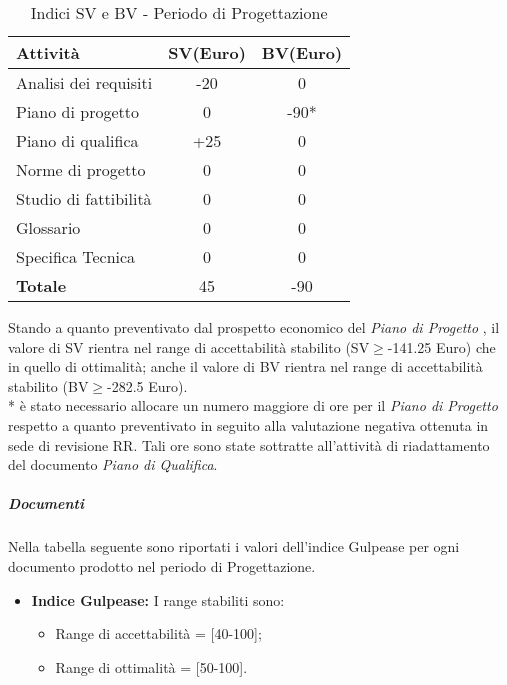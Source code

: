        
      \begin{table}[H]
        \centering
        \begin{tabular}{|l|c|c|}
          \hline
          \textbf{Attività} &\textbf{SV}(Euro)  &\textbf{BV}(Euro) \\
          \hline
          Analisi dei requisiti  &-20 &0  \\
          Piano di progetto &0  &-90*\\
          Piano di qualifica  &+25  &0\\
          Norme di progetto &0  &0 \\
          Studio di fattibilità &0  &0  \\
          Glossario &0  &0  \\
          Specifica Tecnica & 0 & 0\\
          \hline
          \textbf{Totale} &45  &-90  \\
          \hline
        \end{tabular}
        \caption{Indici SV e BV - Periodo di Progettazione}
      \end{table}
      Stando a quanto preventivato dal prospetto economico del \emph{Piano di Progetto \VersionePP{}}, il valore di SV rientra nel range di accettabilità stabilito (SV\(\geq\)-141.25 Euro) che in quello di ottimalità;
      anche il valore di BV rientra nel range di accettabilità stabilito (BV\(\geq\)-282.5 Euro).\\
      * è stato necessario allocare un numero maggiore di ore per il \emph{Piano di Progetto} respetto a quanto preventivato in seguito alla valutazione negativa ottenuta in sede di revisione RR. Tali ore sono state sottratte all'attività di riadattamento del documento \emph{Piano di Qualifica}\VersionePQ{}.
      
      \subparagraph{Documenti}
      Nella tabella seguente sono riportati i valori dell'indice Gulpease per ogni documento prodotto nel periodo di Progettazione.\\

\begin{itemize}
\item \textbf{Indice Gulpease: }I range stabiliti sono:
      \begin{itemize}
        \item Range di accettabilità = [40-100];
        \item Range di ottimalità = [50-100].
      \end{itemize}
\end{itemize}      
      
